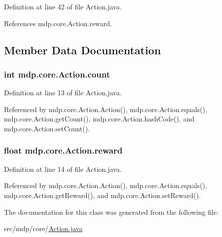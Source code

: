 Definition at line 42 of file Action.\+java.



References mdp.\+core.\+Action.\+reward.



\subsection{Member Data Documentation}
\hypertarget{classmdp_1_1core_1_1_action_a3fd6370ee73fdac8ec8e84e12f02f261}{}
\subsubsection[{count}]{\setlength{\rightskip}{0pt plus 5cm}int mdp.\+core.\+Action.\+count\hspace{0.3cm}{\ttfamily [private]}}\label{classmdp_1_1core_1_1_action_a3fd6370ee73fdac8ec8e84e12f02f261}


Definition at line 13 of file Action.\+java.



Referenced by mdp.\+core.\+Action.\+Action(), mdp.\+core.\+Action.\+equals(), mdp.\+core.\+Action.\+get\+Count(), mdp.\+core.\+Action.\+hash\+Code(), and mdp.\+core.\+Action.\+set\+Count().

\hypertarget{classmdp_1_1core_1_1_action_a6eb542e734aab31ad3c0af8eb7c6f92f}{}
\subsubsection[{reward}]{\setlength{\rightskip}{0pt plus 5cm}float mdp.\+core.\+Action.\+reward\hspace{0.3cm}{\ttfamily [private]}}\label{classmdp_1_1core_1_1_action_a6eb542e734aab31ad3c0af8eb7c6f92f}


Definition at line 14 of file Action.\+java.



Referenced by mdp.\+core.\+Action.\+Action(), mdp.\+core.\+Action.\+equals(), mdp.\+core.\+Action.\+get\+Reward(), and mdp.\+core.\+Action.\+set\+Reward().



The documentation for this class was generated from the following file\+:\begin{DoxyCompactItemize}
\item 
src/mdp/core/\hyperlink{_action_8java}{Action.\+java}\end{DoxyCompactItemize}
